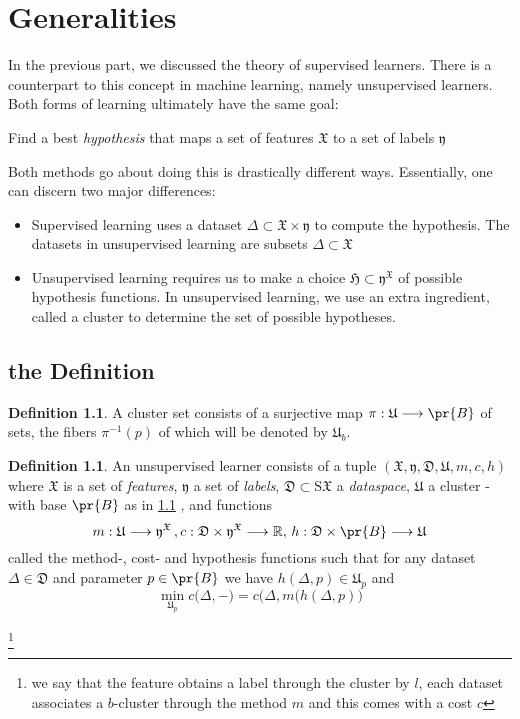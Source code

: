\documentclass{book}
\theoremstyle{plain}
\theoremstyle{definition}
\newtheorem{definition}[corollary]{Definition}
\renewcommand{\d}[1]{\mathbb{#1}}
\newcommand{\f}[1]{\mathfrak{#1}}
\newcommand{\mor}{\longrightarrow}
\newcommand{\sample}[1]{\textrm{S} #1}
\begin{document}
\chapter{Generalities}

In the previous part, we discussed the theory of supervised learners. There is a counterpart to this concept in machine learning, namely unsupervised learners.\\
Both forms of learning ultimately have the same goal: 
\begin{center}
Find a best \emph{hypothesis} that maps a set of features $\f{X}$ to a set of labels $\f{y}$
\end{center}
Both methods go about doing this is drastically different ways. Essentially, one can discern two major differences:

\begin{itemize}
\item Supervised learning uses a dataset $\Delta\subset \f{X}\times \f{y}$ to compute the hypothesis. The datasets in unsupervised learning are subsets $\Delta\subset \f{X}$
\item Unsupervised learning requires us to make a choice $\f{H}\subset \f{y}^\f{X}$ of possible hypothesis functions. In unsupervised learning, we use an extra ingredient, called a cluster to determine the set of possible hypotheses.
\end{itemize}

\section{the Definition}

\begin{definition}\label{unsup:def:cluster}
A cluster set consists of a surjective map $\pi:\f{U}\mor \pr{B}$ of sets, the fibers $\pi^{-1}(p)$ of which will be denoted by $\f{U}_b$.
\end{definition}

\begin{definition}
An unsupervised learner consists of a tuple $(\f{X},\f{y}, \f{D},\f{U}, m,c,h)$ where $\f{X}$ is a set of \emph{features}, $\f{y}$ a set of \emph{labels},  $\f{D}\subset \sample\f{X}$ a \emph{dataspace},   $\f{U}$ a cluster -with base $\pr{B}$ as in \ref{unsup:def:cluster} , and functions
\[
m: \f{U}\mor \f{y}^\f{X}\, , c: \f{D}\times \f{y}^\f{X}\mor \d{R},\,  h: \f{D}\times \pr{B}\mor \f{U}
\]
called the method-, cost- and hypothesis functions such that for any dataset $\Delta \in \f{D}$ and parameter $p \in \pr{B}$ we have $h(\Delta,p)\in \f{U}_p$  and
\[
\min_{\f{U}_p} c\bigg(\Delta,-\bigg) = c\bigg(\Delta,m(h(\Delta,p)\bigg)
\]

\footnote{\noindent we say that the feature obtains a label through the cluster by $l$, each dataset associates a $b$-cluster through the method $m$ and this comes with a cost $c$} 
\end{definition}
\end{document}
